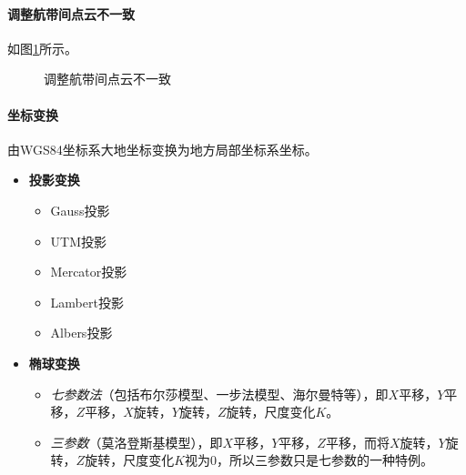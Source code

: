 \paragraph{调整航带间点云不一致}如图\ref{fig:调整航带间点云不一致}所示。
\begin{figure}[htbp]
	\centering
	\caption{调整航带间点云不一致}
	\label{fig:调整航带间点云不一致}
\end{figure}

\paragraph{坐标变换}由WGS84坐标系大地坐标变换为地方局部坐标系坐标。
\begin{itemize}
	\item \textbf{投影变换}
		\begin{itemize}
			\item Gauss投影
			\item UTM投影
			\item Mercator投影
			\item Lambert投影
			\item Albers投影
		\end{itemize}
	\item \textbf{椭球变换}
		\begin{itemize}
			\item \textit{七参数法}（包括布尔莎模型、一步法模型、海尔曼特等），即$ X $平移，$ Y $平 移，$ Z $平移，$ X $旋转，$ Y $旋转，$ Z $旋转，尺度变化$ K $。
			\item \textit{三参数}（莫洛登斯基模型），即$ X $平移，$ Y $平移，$ Z $平移，而将$ X $旋转，$ Y $旋转，$ Z $旋转，尺度变化$ K $视为0，所以三参数只是七参数的一种特例。
		\end{itemize}
\end{itemize}

